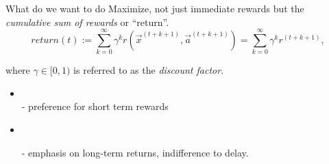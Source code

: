 \begin{frame}\frametitle{\secname}

\begin{block}{What do we want to do}
Maximize, not just immediate rewards but the \emph{cumulative sum of rewards} or ``return''.
\slidesonly{\vspace{-3mm}}
\begin{equation}
\mathit{return}(t) := \sum_{k=0}^{\infty} \gamma^k r(\vec x^{(t+k+1)}, \vec a^{(t+k+1)}) = \sum_{k=0}^{\infty} \gamma^k r^{(t+k+1)},
\end{equation}

where $\gamma \in \lbrack0,1)$ is referred to as the \emph{discount factor}.
 
\end{block}


\begin{itemize}

\pause

\item {}\\

- preference for short term rewards

\pause

\item {}\\

\pause

- emphasis on long-term returns, indifference to delay.

\end{itemize}

\end{frame}

